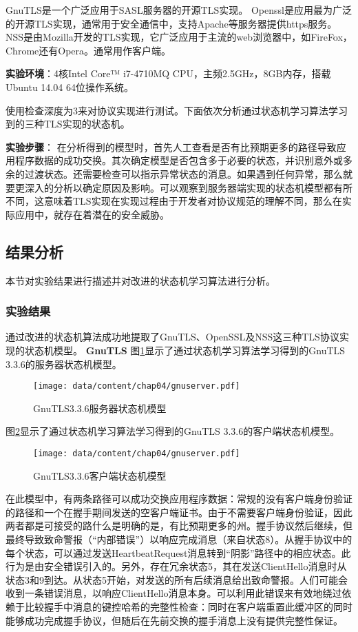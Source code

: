 GnuTLS是一个广泛应用于SASL服务器的开源TLS实现。
Openssl是应用最为广泛的开源TLS实现，通常用于安全通信中，支持Apache等服务器提供https服务。
NSS是由Mozilla开发的TLS实现，它广泛应用于主流的web浏览器中，如FireFox，Chrome还有Opera。通常用作客户端。

\textbf{实验环境}：4核Intel Core™ i7-4710MQ CPU，主频2.5GHz，8GB内存，搭载Ubuntu 14.04 64位操作系统。


使用检查深度为3来对协议实现进行测试。下面依次分析通过状态机学习算法学习到的三种TLS实现的状态机。

\textbf{实验步骤}：
在分析得到的模型时，首先人工查看是否有比预期更多的路径导致应用程序数据的成功交换。其次确定模型是否包含多于必要的状态，并识别意外或多余的过渡状态。还需要检查可以指示异常状态的消息。如果遇到任何异常，那么就要更深入的分析以确定原因及影响。可以观察到服务器端实现的状态机模型都有所不同，这意味着TLS实现在实现过程由于开发者对协议规范的理解不同，那么在实际应用中，就存在着潜在的安全威胁。


\subsection{结果分析}
本节对实验结果进行描述并对改进的状态机学习算法进行分析。
\subsubsection{实验结果}
通过改进的状态机算法成功地提取了GnuTLS、OpenSSL及NSS这三种TLS协议实现的状态机模型。
\textbf{GnuTLS}
图\ref{fig-gnuserver}显示了通过状态机学习算法学习得到的GnuTLS 3.3.6的服务器状态机模型。
\begin{figure}[htp]
	\centering
	\texttt{[image: data/content/chap04/gnuserver.pdf]}
	\caption{GnuTLS3.3.6服务器状态机模型}
	\label{fig-gnuserver}
\end{figure}

图\ref{fig-gnuclient}显示了通过状态机学习算法学习得到的GnuTLS 3.3.6的客户端状态机模型。
\begin{figure}[htp]
	\centering
	\texttt{[image: data/content/chap04/gnuserver.pdf]}
	\caption{GnuTLS3.3.6客户端状态机模型}
	\label{fig-gnuclient}
\end{figure}
在此模型中，有两条路径可以成功交换应用程序数据：常规的没有客户端身份验证的路径和一个在握手期间发送的空客户端证书。由于不需要客户端身份验证，因此两者都是可接受的路什么是明确的是，有比预期更多的州。握手协议然后继续，但最终导致致命警报（“内部错误”）以响应完成消息（来自状态8）。从握手协议中的每个状态，可以通过发送HeartbeatRequest消息转到“阴影”路径中的相应状态。此行为是由安全错误引入的。另外，存在冗余状态5，其在发送ClientHello消息时从状态3和9到达。从状态5开始，对发送的所有后续消息给出致命警报。人们可能会收到一条错误消息，以响应ClientHello消息本身。可以利用此错误来有效地绕过依赖于比较握手中消息的键控哈希的完整性检查：同时在客户端重置此缓冲区的同时能够成功完成握手协议，但随后在先前交换的握手消息上没有提供完整性保证。

